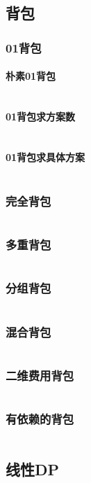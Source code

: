 \documentclass[a4paper,12pt]{article}
\begin{document}
\subsection{背包}
\subsubsection{01背包}
\paragraph{朴素01背包}
\inputminted[breaklines]{c++}{dp/bag/01.cc}
\paragraph{01背包求方案数}
\inputminted[breaklines]{c++}{dp/bag/sum.cc}
\paragraph{01背包求具体方案}
\inputminted[breaklines]{c++}{dp/bag/01_way.cc}
\subsubsection{完全背包}
\inputminted[breaklines]{c++}{dp/bag/comp.cc}
\subsubsection{多重背包}
\inputminted[breaklines]{c++}{dp/bag/mul.cc}
\subsubsection{分组背包}
\inputminted[breaklines]{c++}{dp/bag/group.cc}
\subsubsection{混合背包}
\inputminted[breaklines]{c++}{dp/bag/mix.cc}
\subsubsection{二维费用背包}
\inputminted[breaklines]{c++}{dp/bag/2di.cc}
\subsubsection{有依赖的背包}
\inputminted[breaklines]{c++}{dp/bag/dep.cc}

\subsection{线性DP}
\end{document}

